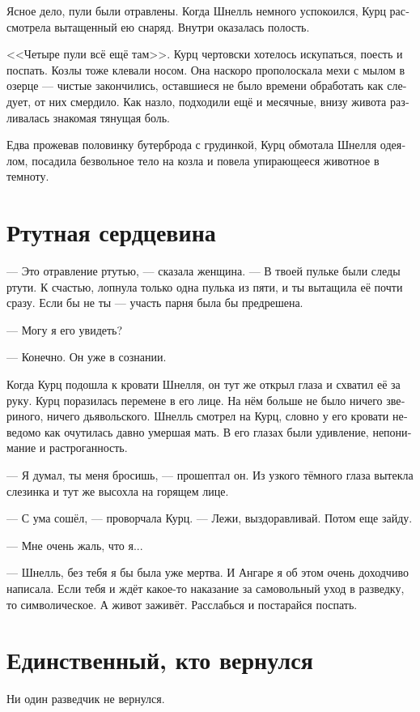 \documentclass[a4paper,10pt,fleqn]{book}\usepackage{polyglossia}\setdefaultlanguage[babelshorthands=true]{russian}\setotherlanguage{english}\defaultfontfeatures{Ligatures=TeX,Mapping=tex-text}\usepackage{xcolor}\newcommand{\ml}[3]{#2}
\begin{document}
Ясное дело, пули были отравлены.
Когда Шнелль немного успокоился, Курц рассмотрела вытащенный ею снаряд.
Внутри оказалась полость.

<<Четыре пули всё ещё там>>.
Курц чертовски хотелось искупаться, поесть и поспать.
Козлы тоже клевали носом.
Она наскоро прополоскала мехи с мылом в озерце --- чистые закончились, оставшиеся не было времени обработать как следует, от них смердило.
Как назло, подходили ещё и месячные, внизу живота разливалась знакомая тянущая боль.

Едва прожевав половинку бутерброда с грудинкой, Курц обмотала Шнелля одеялом, посадила безвольное тело на козла и повела упирающееся животное в темноту.

\section{Ртутная сердцевина}

--- Это отравление ртутью, --- сказала женщина.
--- В твоей пульке были следы ртути.
К счастью, лопнула только одна пулька из пяти, и ты вытащила её почти сразу.
Если бы не ты --- участь парня была бы предрешена.

--- Могу я его увидеть?

--- Конечно.
Он уже в сознании.

Когда Курц подошла к кровати Шнелля, он тут же открыл глаза и схватил её за руку.
Курц поразилась перемене в его лице.
На нём больше не было ничего звериного, ничего дьявольского.
Шнелль смотрел на Курц, словно у его кровати неведомо как очутилась давно умершая мать.
В его глазах были удивление, непонимание и растроганность.

--- Я думал, ты меня бросишь, --- прошептал он.
Из узкого тёмного глаза вытекла слезинка и тут же высохла на горящем лице.

--- С ума сошёл, --- проворчала Курц.
--- Лежи, выздоравливай.
Потом еще зайду.

--- Мне очень жаль, что я...

--- Шнелль, без тебя я бы была уже мертва.
И Ангаре я об этом очень доходчиво написала.
Если тебя и ждёт какое-то наказание за самовольный уход в разведку, то символическое.
А живот заживёт.
Расслабься и постарайся поспать.

\section{Единственный, кто вернулся}

Ни один разведчик не вернулся.
\end{document}
